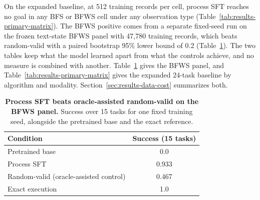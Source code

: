 On the expanded baseline, at 512 training records per cell, process SFT reaches no goal in any BFS or BFWS cell under any observation type (Table~\ref{tab:results-primary-matrix}). The BFWS positive comes from a separate fixed-seed run on the frozen text-state BFWS panel with 47,780 training records, which beats random-valid with a paired bootstrap 95\% lower bound of 0.2 (Table~\ref{tab:results-bfws}). The two tables keep what the model learned apart from what the controls achieve, and no measure is combined with another. Table~\ref{tab:results-bfws} gives the BFWS panel, and Table~\ref{tab:results-primary-matrix} gives the expanded 24-task baseline by algorithm and modality. Section~\ref{sec:results-data-cost} summarizes both.

\begin{table}[t]
\caption{\textbf{Process SFT beats oracle-assisted random-valid on the BFWS panel.} Success over 15 tasks for one fixed training seed, alongside the pretrained base and the exact reference.}
\label{tab:results-bfws}
\centering\footnotesize
\setlength{\tabcolsep}{4pt}
\begin{tabular}{lc}
\toprule[0.4mm]
\rowcolor{mygray}\textbf{Condition} & \textbf{Success (15 tasks)} \\
\midrule
Pretrained base & 0.0 \\
Process SFT & 0.933 \\
Random-valid (oracle-assisted control) & 0.467 \\
Exact execution & 1.0 \\
\bottomrule
\end{tabular}
\end{table}

